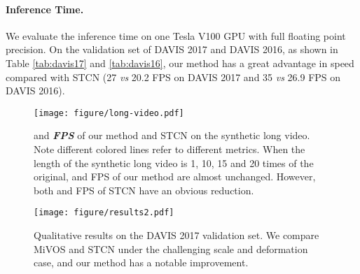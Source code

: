 \documentclass[10pt,twocolumn,letterpaper]{article}
\begin{document}
\begin{table}[!t]
\centering
{}
\caption{Results on the YouTube-VOS 2019 validation set. 
}
\label{tab:youtube19}
\vspace{-1.5em}
\end{table}
\vspace{-1em}
\paragraph{Inference Time.}
We evaluate the inference time on one Tesla V100 GPU with full floating point precision. On the validation set of DAVIS 2017 and DAVIS 2016, as shown in Table \ref{tab:davis17} and \ref{tab:davis16}, our method has a great advantage in speed compared with STCN (27 \textit{vs} 20.2 FPS on DAVIS 2017 and 35 \textit{vs} 26.9 FPS on DAVIS 2016). 


\begin{figure}[t]
\centering \texttt{[image: figure/long-video.pdf]}
\vspace{-1.5em}
\caption{
\textcolor[RGB]{70, 130, 180}{} and  \textcolor[RGB]{255, 0, 0}{\textbf{\textit{FPS}}} of our method and STCN \cite{cheng2021rethinking} on the synthetic long video. Note different colored lines refer to different metrics. When the length of the synthetic long video is 1, 10, 15 and 20 times of the original,  and FPS of our method are almost unchanged. However, both  and FPS of STCN have an obvious reduction.}
\label{fig:long-video}
\vspace{-1em}
\end{figure}
\begin{figure*}[t]
\centering
\texttt{[image: figure/results2.pdf]}
\caption{Qualitative results on the DAVIS 2017 validation set. We compare MiVOS \cite{cheng2021modular} and STCN \cite{cheng2021rethinking} under the challenging scale and deformation case, and our method has a notable improvement.}
\label{fig:results}
\vspace{-1.3em}
\end{figure*}
\end{document}
